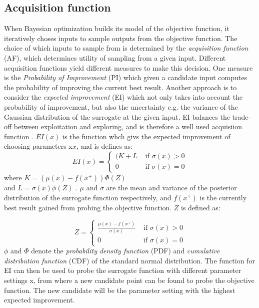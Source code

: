 \subsection{Acquisition function}\label{sec:acquisition-function}
When Bayesian optimization builds its model of the objective function, it iteratively choses inputs to sample outputs from the objective function. The choice of which inputs to sample from is determined by the \emph{acquisition function} (AF), which determines utility of sampling from a given input. Different acquisition functions yield different measures to make this decision. One measure is the \emph{Probability of Improvement} (PI) which given a candidate input computes the probability of improving the current best result.  Another approach is to consider the \emph{expected improvement} (EI) which not only takes into account the probability of improvement, but also the uncertainty e.g. the variance of the Gaussian distribution of the surrogate at the given input.
EI balances the trade-off between exploitation and exploring, and is therefore a well used acquisiion function \citet{brochu2010tutorial}. $EI(x)$ is the function whch givs the expected improvement of choosing parameters x$x$, and is defines as:
\begin{equation}
\label{eq:expected-improvement}
EI(x) =
\begin{cases}
   (K + L & \text{ if } \sigma(x) > 0\\
   0 	  & \text{ if } \sigma(x) = 0
\end{cases}
\end{equation}
where $K = (\mu(x) - f(x^+))\Phi(Z)$ \\and $L = \sigma(x)\phi(Z)$ .
$\mu$ and $\sigma$ are the mean and variance of the posterior distribution of the surrogate function respectively, and $f(x^+)$ is the currently best result gained from probing the objective function. $Z$ is defined as:

\begin{equation}
\label{eq:expect-z}
Z =
\begin{cases}
\frac{\mu(x) - f(x^+)}{\sigma(x)} & \text{ if } \sigma(x) > 0\\
0 								  & \text{ if } \sigma(x) = 0
\end{cases}
\end{equation}
$\phi$ and $\Phi$ denote the \emph{probability density function} (PDF) and \emph{cumulative distribution function} (CDF) of the standard normal distribution.
The function for EI can then be used to probe the surrogate function with different parameter settings x, from where a new candidate point can be found to probe the objective function. The new candidate will be the parameter setting with the highest expected improvement.  

